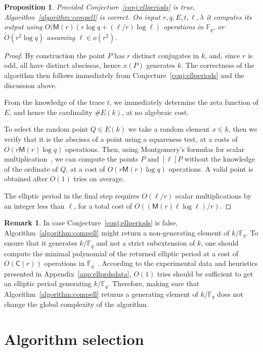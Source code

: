 \documentclass[12pt]{article}
\theoremstyle{plain}
\newtheorem{proposition}[theorem]{Proposition}
\theoremstyle{definition}
\newtheorem*{remark}{Remark}
\newcommand{\tildO}{\tilde{O}}
\def\F{\ensuremath{\mathbb{F}}}
\def\MM{\ensuremath{\mathsf{M}}}
\def\CC{\ensuremath{\mathsf{C}}}
\newcounter{algorithm}
\begin{document}
\begin{proposition}
  Provided Conjecture~\ref{conj:ellperiods} is true,
  Algorithm~\ref{algorithm:compell} is correct. On input
  $r,q,E,t,\ell,\lambda$ it computes its output using
  $O(\MM(r)(r\log{q} + (\ell/r)\log{\ell})$ operations in $\F_q$, or
  $\tildO(r^2\log q)$ assuming $\ell\in o(r^2)$.
\end{proposition}
\begin{proof}
  By construction the point $P$ has $r$ distinct conjugates in
  $k$, and, since $r$ is odd, all have distinct abscissas,
  hence $x(P)$ generates $k$.  The correctness of the algorithm
  then follows immediately from Conjecture~\ref{conj:ellperiods} and
  the discussion above.

  From the knowledge of the trace $t$, we immediately determine the
  zeta function of $E$, and hence the cardinality $\# E(k)$, at
  no algebraic cost.

  To select the random point $Q\in E(k)$ we take a random
  element $x\in k$, then we verify that it is the abscissa of a
  point using a squareness test, at a costs of $O(r\MM(r)\log q)$
  operations. Then, using Montgomery's formulas for scalar
  multiplication~\cite{montgomery}, we can compute the points $P$ and
  $[\ell]P$ without the knowledge of the ordinate of $Q$, at a cost of
  $O(r\MM(r)\log q)$ operations. A valid point is obtained after
  $O(1)$ tries on average.

  The elliptic period in the final step requires $O(\ell/r)$ scalar
  multiplications by an integer less than $\ell$, for a total cost of
  $O((\MM(r)\ell\log\ell)/r)$.
\end{proof}
\begin{remark}
  In case Conjecture~\ref{conj:ellperiods} is false,
  Algorithm~\ref{algorithm:compell} might return a non-generating
  element of $k/\F_q$.
  To ensure that it generates $k/\F_q$ and not a strict subextension of $k$,
  one should compute the minimal polynomial of the returned elliptic period
  at a cost of  $O(\CC(r))$ operations in $\F_q$~\cite{shoup93}.
  According to the experimental data and heuristics presented in
  Appendix~\ref{app:ellprdsdata},
  $O(1)$ tries should be
  sufficient to get an elliptic period generating $k/\F_q$.
  Therefore, making sure that Algorithm~\ref{algorithm:compell}
  returns a generating element of $k/\F_q$
  does not change the global complexity of the algorithm.
\end{remark}

\section{Algorithm selection}
\label{sec:selection}
\end{document}
